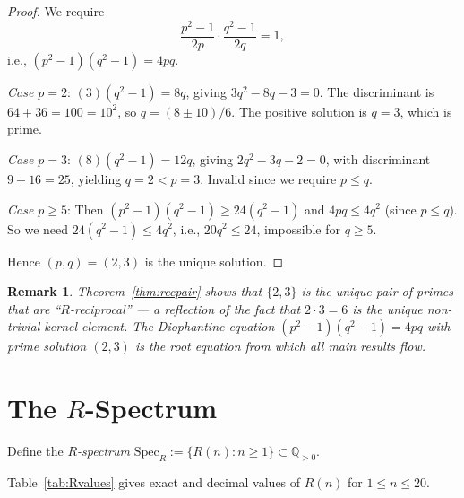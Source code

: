 \documentclass[12pt]{article}
\newtheorem{remark}[theorem]{Remark}
\newcommand{\SpecR}{\mathrm{Spec}_R}
\newcommand{\Q}{\mathbb{Q}}
\begin{document}
\begin{proof}
We require
\[
  \frac{p^2-1}{2p}\cdot\frac{q^2-1}{2q} = 1,
\]
i.e., $(p^2-1)(q^2-1) = 4pq$.

\medskip\noindent\textit{Case $p=2$}: $(3)(q^2-1)=8q$, giving
$3q^2-8q-3=0$.  The discriminant is $64+36=100=10^2$, so
$q=(8\pm10)/6$.  The positive solution is $q=3$, which is prime. \checkmark

\medskip\noindent\textit{Case $p=3$}: $(8)(q^2-1)=12q$, giving
$2q^2-3q-2=0$, with discriminant $9+16=25$, yielding $q=2<p=3$.  Invalid
since we require $p\le q$.

\medskip\noindent\textit{Case $p\ge5$}: Then $(p^2-1)(q^2-1)\ge24(q^2-1)$
and $4pq\le4q^2$ (since $p\le q$).  So we need $24(q^2-1)\le4q^2$,
i.e., $20q^2\le 24$, impossible for $q\ge5$.

Hence $(p,q)=(2,3)$ is the unique solution.
\end{proof}

\begin{remark}
Theorem~\ref{thm:recpair} shows that $\{2,3\}$ is the unique pair of primes
that are ``$R$-reciprocal'' --- a reflection of the fact that $2\cdot3=6$ is
the unique non-trivial kernel element.  The Diophantine equation
$(p^2-1)(q^2-1)=4pq$ with prime solution $(2,3)$ is the \emph{root equation}
from which all main results flow.
\end{remark}

\section{The $R$-Spectrum}
\label{sec:spectrum}

Define the \emph{$R$-spectrum}
$\SpecR := \{R(n) : n\ge1\}\subset\Q_{>0}$.

Table~\ref{tab:Rvalues} gives exact and decimal values of $R(n)$ for $1\le n\le20$.
\end{document}
